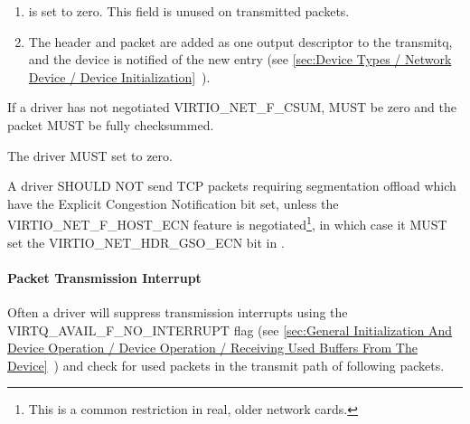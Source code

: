 \begin{enumerate}
\begin{itemize}
  \item {} is the maximum size of each packet beyond that
    header (ie. MSS).

  \item If the driver negotiated the VIRTIO_NET_F_HOST_ECN feature,
    the VIRTIO_NET_HDR_GSO_ECN bit in 
    indicates that the TCP packet has the ECN bit set.\footnote{This case is not handled by some older hardware, so is called out
specifically in the protocol.}
   \end{itemize}

\item {} is set to zero.  This field is unused on transmitted packets.

\item The header and packet are added as one output descriptor to the
  transmitq, and the device is notified of the new entry
  (see \ref{sec:Device Types / Network Device / Device Initialization}~).
\end{enumerate}


If a driver has not negotiated VIRTIO_NET_F_CSUM,  MUST be zero and
the packet MUST be fully checksummed.

The driver MUST set  to zero.

A driver SHOULD NOT send TCP packets requiring segmentation offload which have the Explicit Congestion Notification bit set, unless the VIRTIO_NET_F_HOST_ECN feature is
negotiated\footnote{This is a common restriction in real, older network cards.}, in
which case it MUST set the VIRTIO_NET_HDR_GSO_ECN bit in .

\paragraph{Packet Transmission Interrupt}\label{sec:Device Types / Network Device / Device Operation / Packet Transmission / Packet Transmission Interrupt}

Often a driver will suppress transmission interrupts using the
VIRTQ_AVAIL_F_NO_INTERRUPT flag
 (see \ref{sec:General Initialization And Device Operation / Device Operation / Receiving Used Buffers From The Device}~)
and check for used packets in the transmit path of following
packets.

